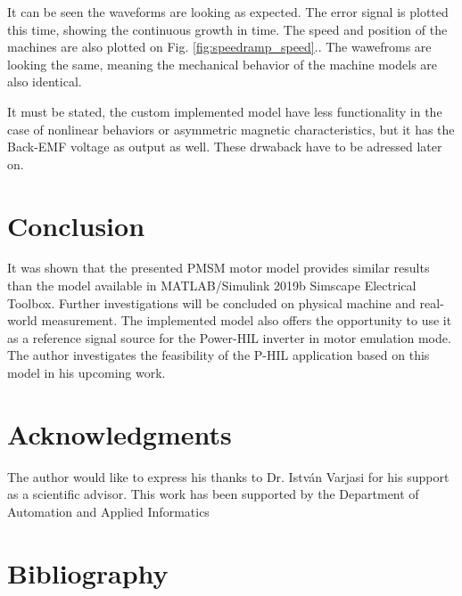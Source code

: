 \documentclass[twoside,b5paper,10pt]{article}
\begin{document}


It can be seen the waveforms are looking as expected. The error signal is plotted this time, showing the continuous growth in time. The speed and position of the machines are also plotted on Fig. \ref{fig:speedramp_speed}.. The wawefroms are looking the same, meaning the mechanical behavior of the machine models are also identical.



It must be stated, the custom implemented model have less functionality in the case of nonlinear behaviors or asymmetric magnetic characteristics, but it has the Back-EMF voltage as output as well. These drwaback have to be adressed later on.

\section{Conclusion}
\label{sec:conclusion}

It was shown that the presented PMSM motor model provides similar results than the model available in MATLAB/Simulink 2019b Simscape Electrical Toolbox. Further investigations will be concluded on physical machine and real-world measurement. The implemented model also offers the opportunity to use it as a reference signal source for the Power-HIL inverter in motor emulation mode. The author investigates the feasibility of the P-HIL application based on this model in his upcoming work. 



\section*{Acknowledgments}
 { \small The author would like to express his thanks to Dr. István Varjasi for his support as a scientific advisor.
This work has been supported by the Department of Automation and Applied Informatics}

\section{Bibliography}
\label{sec:bib}
\end{document}
